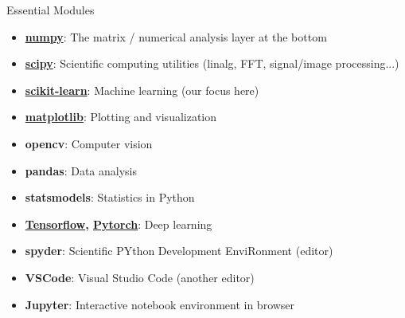 \documentclass[10pt, aspectratio=169]{beamer} %
\begin{document}
\begin{frame}{Essential Modules}
\begin{itemize}
\item \textbf{\href{http://www.numpy.org/}{numpy}}: The matrix / numerical analysis layer at the bottom
\item \textbf{\href{https://www.scipy.org/}{scipy}}: Scientific computing utilities (linalg, FFT, signal/image processing...)
\item \textbf{\href{http://scikit-learn.org}{scikit-learn}}: Machine learning (our focus here)
\item \textbf{\href{http://matplotlib.org/}{matplotlib}}: Plotting and visualization
\item \textbf{opencv}: Computer vision
\item \textbf{pandas}: Data analysis
\item \textbf{statsmodels}: Statistics in Python
\item \textbf{\href{https://www.tensorflow.org/}{Tensorflow}, \href{https://pytorch.org/}{Pytorch}}: Deep learning
\item \textbf{spyder}: Scientific PYthon Development EnviRonment (editor)
\item \textbf{VSCode}: Visual Studio Code (another editor)
\item \textbf{Jupyter}: Interactive notebook environment in browser
\end{itemize}
\end{frame}


\end{document}
